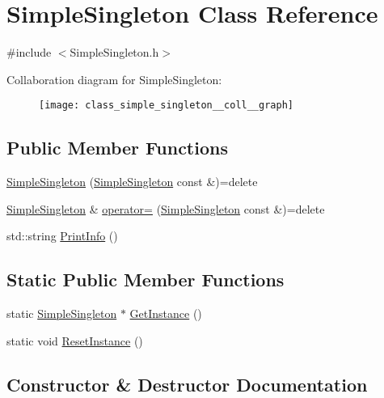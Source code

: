 \hypertarget{class_simple_singleton}{}\section{Simple\+Singleton Class Reference}
\label{class_simple_singleton}


{\ttfamily \#include $<$Simple\+Singleton.\+h$>$}



Collaboration diagram for Simple\+Singleton\+:\nopagebreak
\begin{figure}[H]
\begin{center}
\leavevmode
\texttt{[image: class\_simple\_singleton\_\_coll\_\_graph]}
\end{center}
\end{figure}
\subsection*{Public Member Functions}
\begin{DoxyCompactItemize}
\item 
\mbox{\hyperlink{class_simple_singleton_aeb57c1d8ea17414c1d33ca5e80d1d91d}{Simple\+Singleton}} (\mbox{\hyperlink{class_simple_singleton}{Simple\+Singleton}} const \&)=delete
\item 
\mbox{\hyperlink{class_simple_singleton}{Simple\+Singleton}} \& \mbox{\hyperlink{class_simple_singleton_a5484acd9fdcd902b242ee5e557d6d265}{operator=}} (\mbox{\hyperlink{class_simple_singleton}{Simple\+Singleton}} const \&)=delete
\item 
std\+::string \mbox{\hyperlink{class_simple_singleton_a31826b918981462cc7d2ef0b7261082a}{Print\+Info}} ()
\end{DoxyCompactItemize}
\subsection*{Static Public Member Functions}
\begin{DoxyCompactItemize}
\item 
static \mbox{\hyperlink{class_simple_singleton}{Simple\+Singleton}} $\ast$ \mbox{\hyperlink{class_simple_singleton_af967f13cf4b29765becf0ef7cfb703ad}{Get\+Instance}} ()
\item 
static void \mbox{\hyperlink{class_simple_singleton_a81614f1e12c738b592cb7ec6339dbeed}{Reset\+Instance}} ()
\end{DoxyCompactItemize}


\subsection{Constructor \& Destructor Documentation}
\mbox{\label{class_simple_singleton_aeb57c1d8ea17414c1d33ca5e80d1d91d}} 
